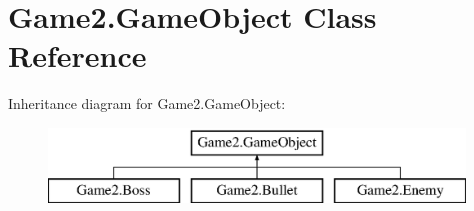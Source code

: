 \hypertarget{class_game2_1_1_game_object}{}\section{Game2.\+Game\+Object Class Reference}
\label{class_game2_1_1_game_object}
Inheritance diagram for Game2.\+Game\+Object\+:\begin{figure}[H]
\begin{center}
\leavevmode
\includegraphics[height=2.000000cm]{class_game2_1_1_game_object}
\end{center}
\end{figure}
